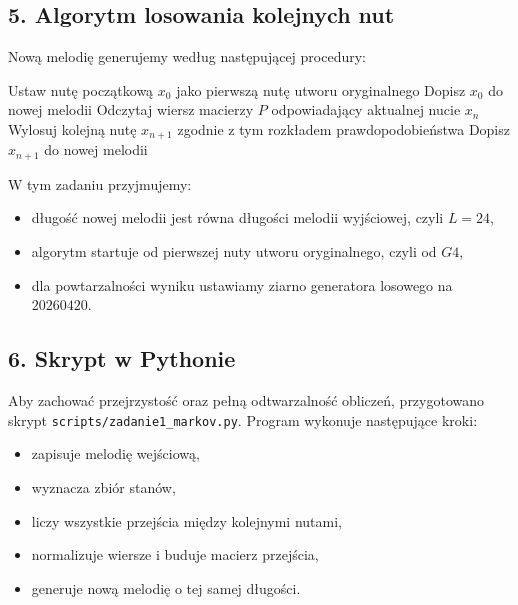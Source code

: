 \documentclass[11pt,a4paper]{article}
\theoremstyle{plain}
\theoremstyle{definition}
\newcounter{zadanie}
\begin{document}
\begin{rozwiazaniebox}
\subsection*{5. Algorytm losowania kolejnych nut}

Now\k{a} melodi\k{e} generujemy wed\l ug nast\k{e}puj\k{a}cej procedury:
\begin{algorithm}[H]
\caption{Generowanie melodii z macierzy przej\'scia}
\begin{algorithmic}[1]
\State Ustaw nut\k{e} pocz\k{a}tkow\k{a} \(x_0\) jako pierwsz\k{a} nut\k{e} utworu oryginalnego
\State Dopisz \(x_0\) do nowej melodii
    \State Odczytaj wiersz macierzy \(P\) odpowiadaj\k{a}cy aktualnej nucie \(x_n\)
    \State Wylosuj kolejn\k{a} nut\k{e} \(x_{n+1}\) zgodnie z tym rozk\l adem prawdopodobie\'nstwa
    \State Dopisz \(x_{n+1}\) do nowej melodii
\EndFor
\end{algorithmic}
\end{algorithm}

W tym zadaniu przyjmujemy:
\begin{itemize}
    \item d\l ugo\'s\'c nowej melodii jest r\'owna d\l ugo\'sci melodii wyj\'sciowej, czyli \(L=24\),
    \item algorytm startuje od pierwszej nuty utworu oryginalnego, czyli od \(G4\),
    \item dla powtarzalno\'sci wyniku ustawiamy ziarno generatora losowego na \(20260420\).
\end{itemize}

\subsection*{6. Skrypt w Pythonie}

Aby zachowa\'c przejrzysto\'s\'c oraz pe\l n\k{a} odtwarzalno\'s\'c oblicze\'n, przygotowano skrypt
\texttt{scripts/zadanie1\_markov.py}. Program wykonuje nast\k{e}puj\k{a}ce kroki:
\begin{itemize}
    \item zapisuje melodi\k{e} wej\'sciow\k{a},
    \item wyznacza zbi\'or stan\'ow,
    \item liczy wszystkie przej\'scia mi\k{e}dzy kolejnymi nutami,
    \item normalizuje wiersze i buduje macierz przej\'scia,
    \item generuje now\k{a} melodi\k{e} o tej samej d\l ugo\'sci.
\end{itemize}


\end{rozwiazaniebox}
\end{document}
